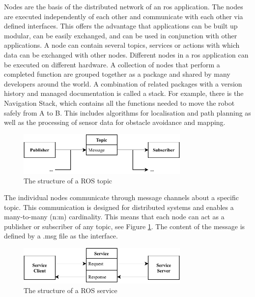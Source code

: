 Nodes are the basis of the distributed network of an \gls{ros} application. The nodes are executed independently of each other and communicate with each other via defined interfaces. This offers the advantage that applications can be built up modular, can be easily exchanged, and can be used in conjunction with other applications. A node can contain several topics, services or actions with which data can be exchanged with other nodes. Different nodes in a \gls{ros} application can be executed on different hardware. A collection of nodes that perform a completed function are grouped together as a package and shared by many developers around the world. A combination of related packages with a version history and managed documentation is called a stack. For example, there is the Navigation Stack, which contains all the functions needed to move the robot safely from A to B. This includes algorithms for localisation and path planning as well as the processing of sensor data for obstacle avoidance and mapping.

\begin{figure}[h]
    \centering
    \includegraphics[width=0.75\textwidth]{figures/20_state_of_the_art/topics.pdf}
    \caption{The structure of a ROS topic}
    \label{fig:topics}
\end{figure}

The individual nodes communicate through message channels about a specific topic. This communication is designed for distributed systems and enables a many-to-many (n:m) cardinality. This means that each node can act as a publisher or subscriber of any topic, see Figure \ref{fig:topics}. The content of the message is defined by a .msg file as the interface.

\begin{figure}[h]
    \centering
    \includegraphics[width=0.75\textwidth]{figures/20_state_of_the_art/services.pdf}
    \caption{The structure of a ROS service}
    \label{fig:services}
\end{figure}

